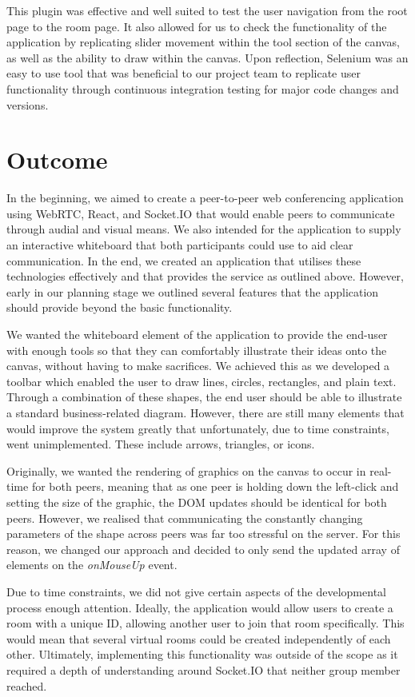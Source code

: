 This plugin was effective and well suited to test the user navigation from the root page to the room page. It also allowed for us to check the functionality of the application by replicating slider movement within the tool section of the canvas, as well as the ability to draw within the canvas. Upon reflection, Selenium was an easy to use tool that was beneficial to our project team to replicate user functionality through continuous integration testing for major code changes and versions.

\section{Outcome}
In the beginning, we aimed to create a peer-to-peer web conferencing application using WebRTC, React, and Socket.IO that would enable peers to communicate through audial and visual means. We also intended for the application to supply an interactive whiteboard that both participants could use to aid clear communication. In the end, we created an application that utilises these technologies effectively and that provides the service as outlined above. However, early in our planning stage we outlined several features that the application should provide beyond the basic functionality. 

We wanted the whiteboard element of the application to provide the end-user with enough tools so that they can comfortably illustrate their ideas onto the canvas, without having to make sacrifices. We achieved this as we developed a toolbar which enabled the user to draw lines, circles, rectangles, and plain text. Through a combination of these shapes, the end user should be able to illustrate a standard business-related diagram. However, there are still many elements that would improve the system greatly that unfortunately, due to time constraints, went unimplemented. These include arrows, triangles, or icons.

Originally, we wanted the rendering of graphics on the canvas to occur in real-time for both peers, meaning that as one peer is holding down the left-click and setting the size of the graphic, the DOM updates should be identical for both peers. However, we realised that communicating the constantly changing parameters of the shape across peers was far too stressful on the server. For this reason, we changed our approach and decided to only send the updated array of elements on the \textit{onMouseUp} event.   

Due to time constraints, we did not give certain aspects of the developmental process enough attention. Ideally, the application would allow users to create a room with a unique ID, allowing another user to join that room specifically. This would mean that several virtual rooms could be created independently of each other. Ultimately, implementing this functionality was outside of the scope as it required a depth of understanding around Socket.IO that neither group member reached.    

